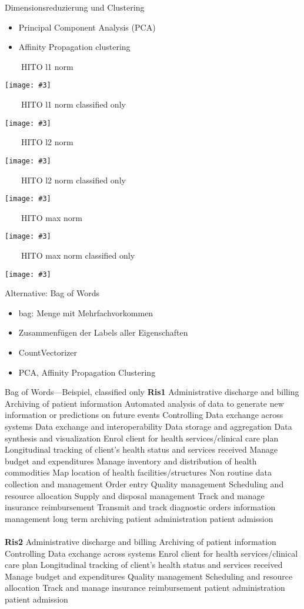 \documentclass[aspectratio=1610]{beamer}
\newcommand{\imageslide}[4][]
{
\begin{frame}[plain]{~~~~#2}
\vspace{0.2em}
\begin{center}
\centering\texttt{[image: \#3]}
\end{center}
#1
\note{#4}
\end{frame}
}
\begin{document}
\begin{frame}{Dimensionsreduzierung und Clustering}
\begin{itemize}
\item Principal Component Analysis (PCA)
\item Affinity Propagation clustering
\end{itemize}
\end{frame}

\imageslide{HITO l1 norm}{img/cluster-l1.pdf}{}
\imageslide{HITO l1 norm classified only}{img/cluster-classifiedonly-l1.pdf}{}
\imageslide{HITO l2 norm}{img/cluster-l2.pdf}{}
\imageslide{HITO l2 norm classified only}{img/cluster-classifiedonly-l2.pdf}{}
\imageslide{HITO max norm}{img/cluster-max.pdf}{}
\imageslide{HITO max norm classified only}{img/cluster-classifiedonly-max.pdf}{}


\begin{frame}{Alternative: Bag of Words}
\begin{itemize}
\item bag: Menge mit Mehrfachvorkommen
\item Zusammenfügen der Labels aller Eigenschaften
\item CountVectorizer
\item PCA, Affinity Propagation Clustering
\end{itemize}
\end{frame}

\begin{frame}{Bag of Words---Beispiel, classified only}
\small
\textbf{Ris1} Administrative discharge and billing Archiving of patient information Automated analysis of data to generate new information or predictions on future events Controlling Data exchange across systems Data exchange and interoperability Data storage and aggregation Data synthesis and visualization Enrol client for health services/clinical care plan Longitudinal tracking of client’s health status and services received Manage budget and expenditures Manage inventory and distribution of health commodities Map location of health facilities/structures Non routine data collection and management Order entry Quality management Scheduling and resource allocation Supply and disposal management Track and manage insurance reimbursement Transmit and track diagnostic orders information management long term archiving patient administration patient admission
\\~\\
\textbf{Ris2} Administrative discharge and billing Archiving of patient information Controlling Data exchange across systems Enrol client for health services/clinical care plan Longitudinal tracking of client’s health status and services received Manage budget and expenditures Quality management Scheduling and resource allocation Track and manage insurance reimbursement patient administration patient admission
\end{frame}
\end{document}
